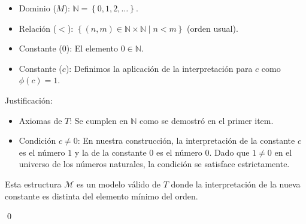 \begin{itemize}
      \begin{itemize}
         \item Dominio ($M$): $\mathbb{N}=\left\lbrace 0,1,2,\dots \right\rbrace$.
         \item Relación ($<$): $\left\lbrace (n,m)\in \mathbb{N}\times \mathbb{N} \mid n<m \right\rbrace$ (orden usual).
         \item Constante ($0$): El elemento $0\in \mathbb{N}$.
         \item Constante ($c$): Definimos la aplicación de la interpretación para $c$ como $\phi(c)=1$.
      \end{itemize}
      Justificación:
      \begin{itemize}
         \item Axiomas de $T$: Se cumplen en $\mathbb{N}$ como se demostró en el primer item.
         \item Condición $c\neq 0$: En nuestra construcción, la interpretación de la constante $c$ es el número $1$ y la de la constante $0$ es el número $0$. Dado que $1\neq 0$ en el universo de los números naturales, la condición se satisface estrictamente.
      \end{itemize}
      Esta estructura $\mathcal{M}$ es un modelo válido de $T$ donde la interpretación de la nueva constante es distinta del elemento mínimo del orden.
\end{itemize}
\hfill\qed


